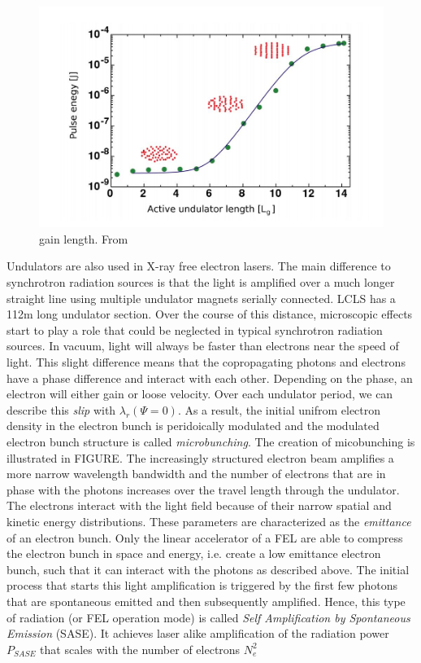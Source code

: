 \begin{figure}
	\centering
		\includegraphics[width=1.00\textwidth]{images/gain-length.JPG}
	\caption{gain length. From \citep{Rupp-2013-Thesis,Rupp-2016-Springer}}
	\label{fig:gain-length}
\end{figure}
Undulators are also used in X-ray free electron lasers. The main difference to synchrotron radiation sources is that the light is amplified over a much longer straight line using multiple undulator magnets serially connected. LCLS has a 112m long undulator section. Over the course of this distance, microscopic effects start to play a role that could be neglected in typical synchrotron radiation sources. In vacuum, light will always be faster than electrons near the speed of light. This slight difference means that the copropagating photons and electrons have a phase difference and interact with each other. Depending on the phase, an electron will either gain or loose velocity. Over each undulator period, we can describe this \textit{slip} with $\lambda_{r}(\Psi = 0)$. As a result, the initial unifrom electron density in the electron bunch is peridoically modulated and the modulated electron bunch structure is called \textit{microbunching}. The creation of micobunching is illustrated in FIGURE. The increasingly structured electron beam amplifies a more narrow wavelength bandwidth and the number of electrons that are in phase with the photons increases over the travel length through the undulator. The electrons interact with the light field because of their narrow spatial and kinetic energy distributions. These parameters are characterized as the \textit{emittance} of an electron bunch. Only the linear accelerator of a FEL are able to compress the electron bunch in space and energy, i.e. create a low emittance electron bunch, such that it can interact with the photons as described above. The initial process that starts this light amplification is triggered by the first few photons that are spontaneous emitted and then subsequently amplified. Hence, this type of radiation (or FEL operation mode) is called \textit{Self Amplification by Spontaneous Emission} (SASE). It achieves laser alike amplification of the radiation power $P_{SASE}$ that scales with the number of electrons $N_{e}^{2}$
